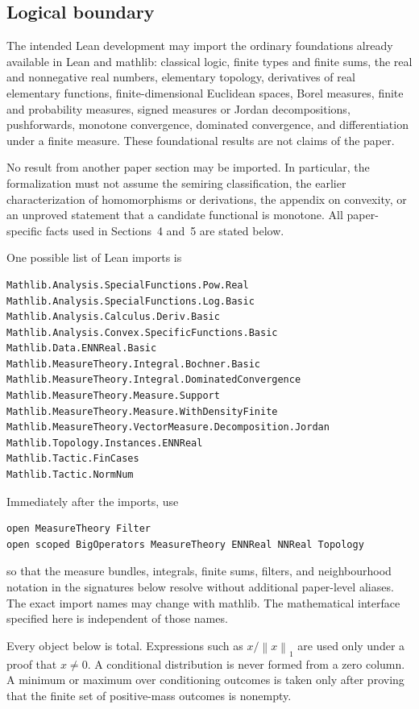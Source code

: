 \documentclass[9pt]{extarticle}
\theoremstyle{definition}
\theoremstyle{remark}
\newcommand{\norm}[1]{\left\lVert #1\right\rVert}
\begin{document}
\subsection{Logical boundary}

The intended Lean development may import the ordinary foundations already
available in Lean and mathlib: classical logic, finite types and finite sums,
the real and nonnegative real numbers, elementary topology, derivatives of
real elementary functions, finite-dimensional Euclidean spaces, Borel
measures, finite and probability measures, signed measures or Jordan
decompositions, pushforwards, monotone convergence, dominated convergence,
and differentiation under a finite measure.  These foundational results are
not claims of the paper.

No result from another paper section may be imported.  In
particular, the formalization must not assume the semiring classification,
the earlier characterization of homomorphisms or derivations, the appendix on
convexity, or an unproved statement that a candidate functional is monotone.
All paper-specific facts used in Sections~4 and~5 are stated below.

One possible list of Lean imports is
\begin{verbatim}
Mathlib.Analysis.SpecialFunctions.Pow.Real
Mathlib.Analysis.SpecialFunctions.Log.Basic
Mathlib.Analysis.Calculus.Deriv.Basic
Mathlib.Analysis.Convex.SpecificFunctions.Basic
Mathlib.Data.ENNReal.Basic
Mathlib.MeasureTheory.Integral.Bochner.Basic
Mathlib.MeasureTheory.Integral.DominatedConvergence
Mathlib.MeasureTheory.Measure.Support
Mathlib.MeasureTheory.Measure.WithDensityFinite
Mathlib.MeasureTheory.VectorMeasure.Decomposition.Jordan
Mathlib.Topology.Instances.ENNReal
Mathlib.Tactic.FinCases
Mathlib.Tactic.NormNum
\end{verbatim}
Immediately after the imports, use
\begin{verbatim}
open MeasureTheory Filter
open scoped BigOperators MeasureTheory ENNReal NNReal Topology
\end{verbatim}
so that the measure bundles, integrals, finite sums, filters, and
neighbourhood notation in the signatures below resolve without additional
paper-level aliases.
The exact import names may change with mathlib.  The mathematical interface
specified here is independent of those names.

Every object below is total.  Expressions such as $x/\norm{x}_1$ are used
only under a proof that $x\neq0$.  A conditional distribution is never formed
from a zero column.  A minimum or maximum over conditioning outcomes is taken
only after proving that the finite set of positive-mass outcomes is nonempty.
\end{document}

